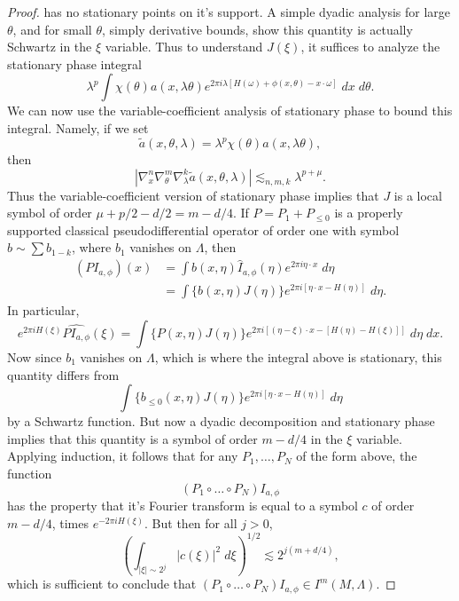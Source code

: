 \begin{proof}
    has no stationary points on it's support. A simple dyadic analysis for large $\theta$, and for small $\theta$, simply derivative bounds, show this quantity is actually Schwartz in the $\xi$ variable. Thus to understand $J(\xi)$, it suffices to analyze the stationary phase integral
    \[ \lambda^p \int \chi(\theta) a(x, \lambda \theta) e^{2 \pi i \lambda [ H(\omega) + \phi(x,\theta) - x \cdot \omega ]}\; dx\; d\theta. \]
    We can now use the variable-coefficient analysis of stationary phase to bound this integral. Namely, if we set
    \[ \tilde{a}(x,\theta,\lambda) = \lambda^p \chi(\theta) a(x,\lambda \theta), \]
    then
    \[ |\nabla^n_x \nabla^m_\theta \nabla^k_\lambda \tilde{a}(x, \theta, \lambda)| \lesssim_{n,m,k} \lambda^{p + \mu}. \]
    Thus the variable-coefficient version of stationary phase implies that $J$ is a local symbol of order $\mu + p/2 - d/2 = m - d/4$. If $P = P_1 + P_{\leq 0}$ is a properly supported classical pseudodifferential operator of order one with symbol $b \sim \sum b_{1-k}$, where $b_1$ vanishes on $\Lambda$, then
    \begin{align*}
        (P I_{a,\phi})(x) &= \int b(x,\eta) \widehat{I}_{a,\phi}(\eta) e^{2 \pi i \eta \cdot x}\; d\eta\\
        &= \int \{ b(x,\eta)  J(\eta) \} e^{2 \pi i [\eta \cdot x - H(\eta)]}\; d\eta.
    \end{align*}
    In particular,
    \[ e^{2 \pi i H(\xi)} \widehat{P I_{a,\phi}}(\xi) = \int \{ P(x,\eta) J(\eta) \} e^{2 \pi i [ (\eta - \xi) \cdot x - [H(\eta) - H(\xi)] ]}\; d\eta\; dx. \]
    Now since $b_1$ vanishes on $\Lambda$, which is where the integral above is stationary, this quantity differs from
    \[ \int \{ b_{\leq 0}(x,\eta) J(\eta) \} e^{2 \pi i [\eta \cdot x - H(\eta)]}\; d\eta \]
    by a Schwartz function. But now a dyadic decomposition and stationary phase implies that this quantity is a symbol of order $m - d/4$ in the $\xi$ variable. Applying induction, it follows that for any $P_1,\dots,P_N$ of the form above, the function
    \[ (P_1 \circ \dots \circ P_N) I_{a,\phi} \]
    has the property that it's Fourier transform is equal to a symbol $c$ of order $m - d/4$, times $e^{-2 \pi i H(\xi)}$. But then for all $j > 0$,
    \[ \left( \int_{|\xi| \sim 2^j} |c(\xi)|^2\; d\xi \right)^{1/2} \lesssim 2^{j(m + d/4)}, \]
    which is sufficient to conclude that $(P_1 \circ \dots \circ P_N) I_{a,\phi} \in I^m(M,\Lambda)$.
\end{proof}

